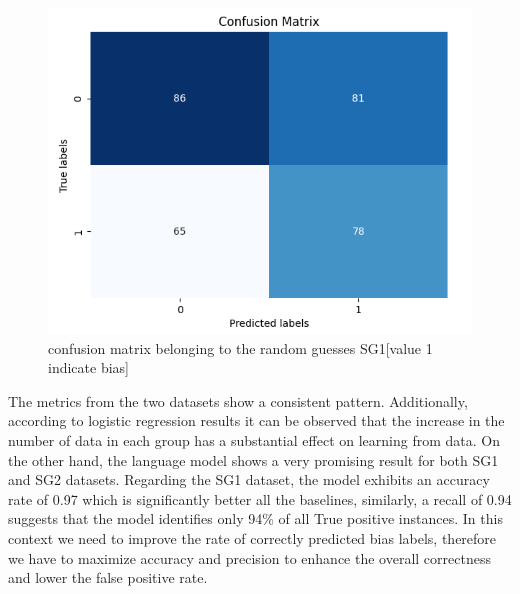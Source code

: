 \documentclass[11pt,a4paper]{article}
\begin{document}
\begin{figure}
    \centering
    \includegraphics[width=0.9\linewidth]{cm_SG1_random_guess.png}
    \caption{confusion matrix belonging to the random guesses SG1[value 1 indicate bias]}
    \label{fig:enter-label}
\end{figure}
The metrics from the two datasets show a consistent pattern. Additionally, according to logistic regression results it can be observed that the increase in the number of data in each group has a substantial effect on learning from data.
On the other hand, the language model shows a very promising result for both SG1 and SG2 datasets. Regarding the SG1 dataset, the model exhibits an accuracy rate of 0.97 which is significantly better all the baselines, similarly, a recall of 0.94 suggests that the model identifies only 94\% of all True positive instances.
In this context we need to improve the rate of correctly predicted bias labels, therefore we have to maximize accuracy and precision to enhance the overall correctness and lower the false positive rate.
\end{document}
